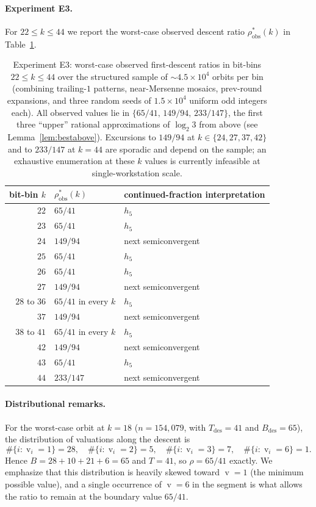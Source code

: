 \documentclass[11pt,a4paper]{article}
\theoremstyle{definition}
\theoremstyle{remark}
\DeclareMathOperator{\val}{v}
\begin{document}
\paragraph{Experiment E3.}
For $22 \leq k \leq 44$ we report the worst-case observed descent
ratio $\rho^{*}_{\mathrm{obs}}(k)$ in Table~\ref{tab:E3}.

\begin{table}[htbp]
\centering
\begin{tabular}{r l l}
\toprule
bit-bin $k$ & $\rho^{*}_{\mathrm{obs}}(k)$ & continued-fraction interpretation \\
\midrule
$22$ & $65/41$ & $h_5$ \\
$23$ & $65/41$ & $h_5$ \\
$24$ & $149/94$ & next semiconvergent \\
$25$ & $65/41$ & $h_5$ \\
$26$ & $65/41$ & $h_5$ \\
$27$ & $149/94$ & next semiconvergent \\
$28$ to $36$ & $65/41$ in every $k$ & $h_5$ \\
$37$ & $149/94$ & next semiconvergent \\
$38$ to $41$ & $65/41$ in every $k$ & $h_5$ \\
$42$ & $149/94$ & next semiconvergent \\
$43$ & $65/41$ & $h_5$ \\
$44$ & $233/147$ & next semiconvergent \\
\bottomrule
\end{tabular}
\caption{Experiment E3: worst-case observed first-descent ratios in
bit-bins $22 \leq k \leq 44$ over the structured sample of
$\sim 4.5 \times 10^4$ orbits per bin (combining trailing-$1$
patterns, near-Mersenne mosaics, prev-round expansions, and three
random seeds of $1.5 \times 10^4$ uniform odd integers each).  All
observed values lie in $\{65/41,\, 149/94,\, 233/147\}$, the first
three ``upper'' rational approximations of $\log_2 3$ from above
(see Lemma~\ref{lem:bestabove}).  Excursions to $149/94$ at
$k \in \{24, 27, 37, 42\}$ and to $233/147$ at $k = 44$ are sporadic
and depend on the sample; an exhaustive enumeration at these $k$
values is currently infeasible at single-workstation scale.}
\label{tab:E3}
\end{table}

\paragraph{Distributional remarks.}
For the worst-case orbit at $k = 18$ ($n = 154{,}079$, with
$T_{\mathrm{des}} = 41$ and $B_{\mathrm{des}} = 65$), the
distribution of valuations along the descent is
\begin{equation}\label{eq:dist}
  \#\{i : \val_i = 1\} = 28,
  \quad
  \#\{i : \val_i = 2\} = 5,
  \quad
  \#\{i : \val_i = 3\} = 7,
  \quad
  \#\{i : \val_i = 6\} = 1.
\end{equation}
Hence $B = 28 + 10 + 21 + 6 = 65$ and $T = 41$, so
$\rho = 65/41$ exactly.  We emphasize that this distribution is
heavily skewed toward $\val = 1$ (the minimum possible value), and a
single occurrence of $\val = 6$ in the segment is what allows the
ratio to remain at the boundary value $65/41$.
\end{document}
